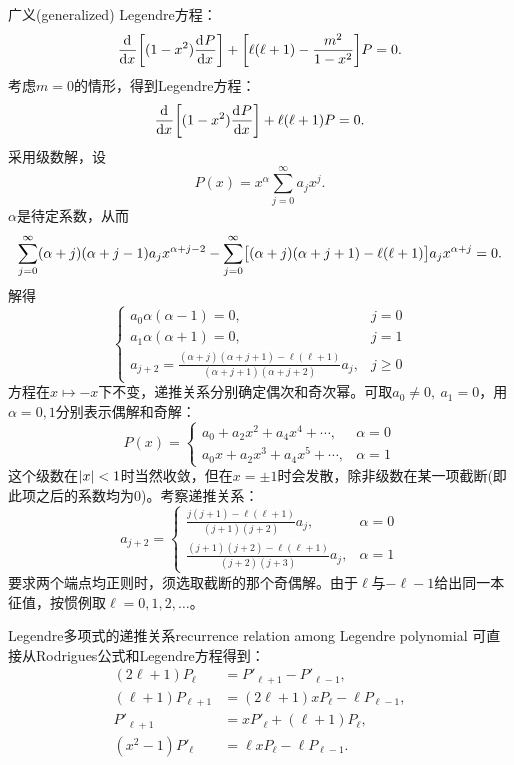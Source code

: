 广义(generalized) Legendre方程：
\begin{equation}
    \frac{\mathop{}\!\mathrm{d}^{}}{\mathrm{d}{x}^{}}\biggl[(1 - x^2)\frac{\mathop{}\!\mathrm{d}^{}P}{\mathrm{d}{x}^{}}\biggr] + \biggl[\ell(\ell + 1) - \frac{m^2}{1 - x^2}\biggr]P = 0.
\end{equation}
考虑$m = 0$的情形，得到Legendre方程：
\begin{equation}
    \frac{\mathop{}\!\mathrm{d}^{}}{\mathrm{d}{x}^{}}\biggl[(1 - x^2)\frac{\mathop{}\!\mathrm{d}^{}P}{\mathrm{d}{x}^{}}\biggr] + \ell(\ell + 1)P = 0.
\end{equation}
采用级数解，设
\[
    P(x) = x^\alpha\sum_{j=0}^\infty a_jx^j.
\]
$\alpha$是待定系数，从而 
\[
    \sum_{j=0}^\infty(\alpha + j)(\alpha + j - 1)a_j x^{\alpha+j-2} - \sum_{j=0}^\infty\bigl[(\alpha + j)(\alpha + j + 1) - \ell(\ell + 1)\bigr]a_jx^{\alpha+j} = 0.
\]
解得
\[
    \begin{cases}
        a_0\alpha(\alpha - 1) = 0,&j = 0\\
        a_1\alpha(\alpha + 1) = 0,&j = 1\\
        a_{j+2} = \frac{(\alpha + j)(\alpha + j + 1) - \ell(\ell + 1)}{(\alpha + j + 1)(\alpha + j + 2)}a_j,&j \geqslant 0
    \end{cases}
\]
方程在$x \mapsto -x$下不变，递推关系分别确定偶次和奇次幂。可取$a_0 \ne 0,\ a_1 = 0$，用$\alpha = 0,1$分别表示偶解和奇解：
\[
    P(x) = \begin{cases}
        a_0 + a_2x^2 + a_4x^4 + \cdots,&\alpha = 0\\
        a_0x + a_2x^3 + a_4x^5 + \cdots,&\alpha = 1
    \end{cases}
\]
这个级数在$\lvert x\rvert < 1$时当然收敛，但在$x = \pm1$时会发散，除非级数在某一项截断(即此项之后的系数均为0)。考察递推关系：
\begin{equation}
    \label{eq:ed-legendre-series-recurrence}
    a_{j+2} = \begin{cases}
        \frac{j(j + 1) - \ell(\ell + 1)}{(j + 1)(j + 2)}a_j,&\alpha = 0\\[2ex]
        \frac{(j + 1)(j + 2) - \ell(\ell + 1)}{(j + 2)(j + 3)}a_j,&\alpha = 1
    \end{cases}
\end{equation}
要求两个端点均正则时，须选取截断的那个奇偶解。由于$\ell$与$-\ell - 1$给出同一本征值，按惯例取$\ell = 0,1,2,\ldots$。
\begin{theorem}{Legendre多项式的递推关系}{recurrence relation among Legendre polynomial}
    可直接从Rodrigues公式和Legendre方程得到：
    \begin{subequations}
        \begin{align}
            \label{eqn:Legendre recurrence 1}
            (2\ell + 1)P_\ell &= P'_{\ell+1} - P'_{\ell-1},\\
            (\ell + 1)P_{\ell+1} &= (2\ell + 1)xP_\ell - \ell P_{\ell-1},\\
            P'_{\ell+1} &= xP'_\ell + (\ell + 1)P_\ell,\\
            (x^2 - 1)P'_\ell &= \ell xP_\ell - \ell P_{\ell-1}.
        \end{align}
    \end{subequations}
\end{theorem}
